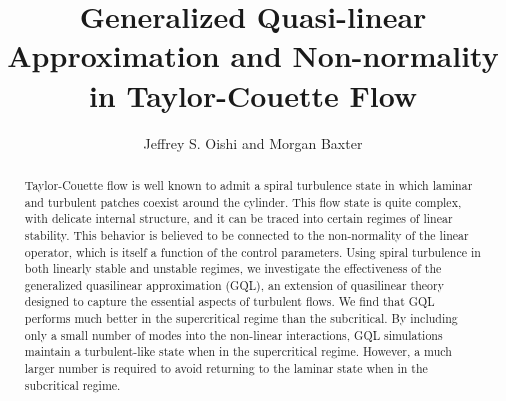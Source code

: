 \documentclass[openacc]{rstransa}%
\begin{document}
\title{Generalized Quasi-linear Approximation and Non-normality in Taylor-Couette Flow}

\author{%
Jeffrey S. Oishi and Morgan Baxter}

\address{Department of Physics and Astronomy, Bates College, Lewiston, ME USA}

\subject{xxxxx, xxxxx, xxxx}



\begin{abstract}
Taylor-Couette flow is well known to admit a spiral turbulence state in which laminar and turbulent patches coexist around the cylinder. This flow state is quite complex, with delicate internal structure, and it can be traced into certain regimes of linear stability. This behavior is believed to be connected to the non-normality of the linear operator, which is itself a function of the control parameters. Using spiral turbulence in both linearly stable and unstable regimes, we investigate the effectiveness of the generalized quasilinear approximation (GQL), an extension of quasilinear theory designed to capture the essential aspects of turbulent flows. We find that GQL performs much better in the supercritical regime than the subcritical. By including only a small number of modes into the non-linear interactions, GQL simulations maintain a turbulent-like state when in the supercritical regime. However, a much larger number is required to avoid returning to the laminar state when in the subcritical regime. 
\end{abstract}



\maketitle
\end{document}
